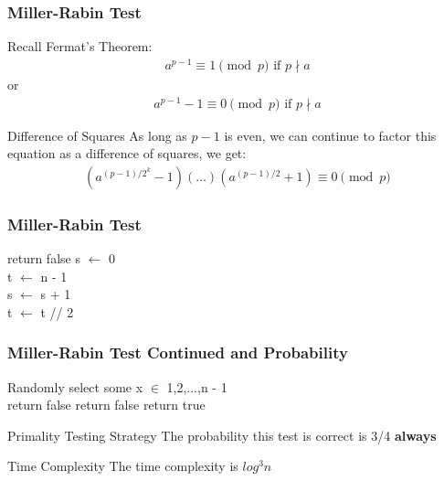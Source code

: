 \documentclass{beamer}
\begin{document}
\begin{frame}
\frametitle{Miller-Rabin Test}

\begin{block}{Recall}
    Fermat's Theorem:
    \begin{align*}
        a^{p-1} \equiv 1 \pmod p \text{ if } p \nmid a
    \end{align*}
    or 
    \begin{align*}
        a^{p-1} - 1 \equiv 0 \pmod p \text{ if } p \nmid a
    \end{align*}
\end{block}
\begin{block}{Difference of Squares}
    As long as $p - 1$ is even, we can continue to factor this equation as a difference of squares, we get:
    \begin{align*}
        (a^{(p-1)/2^k} - 1)(...)(a^{(p-1)/2} + 1) \equiv 0 \pmod p
    \end{align*}
\end{block}

\end{frame}

\begin{frame}

\frametitle{Miller-Rabin Test}
    \begin{algorithm2e}
        \SetAlgoLined
        
         {return false} 
        s $\leftarrow$ 0 \\
        t $\leftarrow$ n - 1 \\
         {
            s $\leftarrow$ s + 1 \\
            t $\leftarrow$ t // 2 \\
            }
    \end{algorithm2e}
\end{frame}
\begin{frame}
\frametitle{Miller-Rabin Test Continued and Probability}
    \begin{algorithm2e}
        Randomly select some x $\in$ {1,2,...,n - 1} \\
         {return false}
         {
             {
                return false
            }
        }
        return true
    \end{algorithm2e}
    \begin{block}{Primality Testing Strategy}
        The probability this test is correct is 3/4 \textbf{always}
    \end{block}
    \begin{block}{Time Complexity}
        The time complexity is $log^3n$
    \end{block}
\end{frame}
\end{document}
